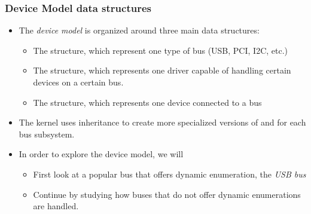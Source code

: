 \begin{frame}
  \frametitle{Device Model data structures}
  \begin{itemize}
  \item The {\em device model} is organized around three main data
    structures:
    \begin{itemize}
    \item The  structure, which represent one type of bus
      (USB, PCI, I2C, etc.)
    \item The  structure, which represents one driver
      capable of handling certain devices on a certain bus.
    \item The  structure, which represents one device
      connected to a bus
    \end{itemize}
  \item The kernel uses inheritance to create more specialized
    versions of  and 
    for each bus subsystem.
  \item In order to explore the device model, we will
    \begin{itemize}
    \item First look at a popular bus that offers dynamic enumeration,
      the {\em USB bus}
    \item Continue by studying how buses that do not offer dynamic
      enumerations are handled.
    \end{itemize}
  \end{itemize}
\end{frame}

